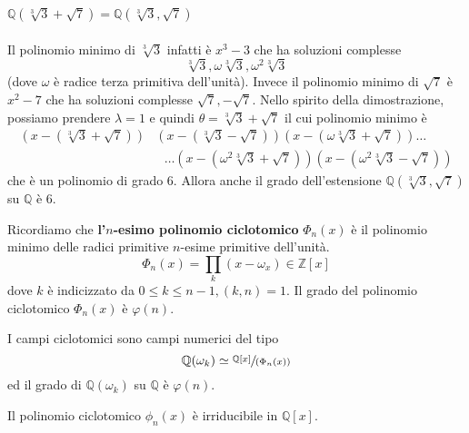 \begin{esempio}
	$\mathbb{Q}(\sqrt[3]{3}+\sqrt{7})=\mathbb{Q}(\sqrt[3]{3},\sqrt{7})$ \\ \\ 
	Il polinomio minimo di $\sqrt[3]{3}$ infatti è $x^3-3$ che ha soluzioni complesse 
	\begin{equation*}
	\sqrt[3]{3}, \omega \sqrt[3]{3}, \omega^2 \sqrt[3]{3}
	\end{equation*}
	(dove $\omega$ è radice terza primitiva dell'unità). Invece il polinomio minimo di $\sqrt{7}$ è $x^2-7$ che ha soluzioni complesse $\sqrt{7}, -\sqrt{7}$. Nello spirito della dimostrazione, possiamo prendere $\lambda=1$ e quindi $\theta=\sqrt[3]{3}+\sqrt{7}$ il cui polinomio minimo è
	\begin{align*}
	\left(x-(\sqrt[3]{3}+\sqrt{7})\right)&\left(x-(\sqrt[3]{3}-\sqrt{7})\right)\left(x-(\omega\sqrt[3]{3}+\sqrt{7})\right)\dots\\
	&\ \ \ \dots \left(x-(\omega^2\sqrt[3]{3}+\sqrt{7})\right)\left(x-(\omega^2\sqrt[3]{3}-\sqrt{7})\right)
	\end{align*}
	che è un polinomio di grado 6. Allora anche il grado dell'estensione $\mathbb{Q}(\sqrt[3]{3},\sqrt{7})$ su $\mathbb{Q}$ è 6.
\end{esempio}
\begin{definizione}
	Ricordiamo che \textbf{l'$n$-esimo polinomio ciclotomico} $\Phi_n(x)$ è il polinomio minimo delle radici primitive $n$-esime primitive dell'unità.
	\begin{equation*}
	\Phi_n(x)=\prod_{k}(x-\omega_x)\in\mathbb{Z}[x]
	\end{equation*}
	dove $k$ è indicizzato da $0\leq k\leq n-1, (k,n)=1$. Il grado del polinomio ciclotomico $\Phi_n(x)$ è $\varphi(n)$.
\end{definizione}
\begin{definizione}
	I campi ciclotomici sono campi numerici del tipo
	\begin{equation*}
	\mathbb{Q}(\omega_k)\simeq\sfrac{\mathbb{Q}[x]}{(\Phi_n(x))}
	\end{equation*}
	ed il grado di $\mathbb{Q}(\omega_k)$ su $\mathbb{Q}$ è $\varphi(n)$.
\end{definizione}
\begin{teorema}
	Il polinomio ciclotomico $\phi_n(x)$ è irriducibile in $\mathbb{Q}[x]$.
\end{teorema}
